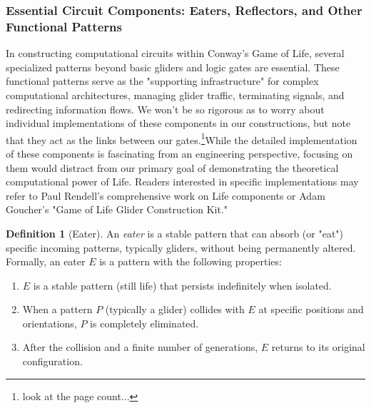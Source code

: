 \documentclass{article}
\theoremstyle{definition}
\newtheorem{definition}{Definition}[section]
\theoremstyle{plain}
\theoremstyle{plain}
\begin{document}



\subsubsection{Essential Circuit Components: Eaters, Reflectors, and Other Functional Patterns}
In constructing computational circuits within Conway's Game of Life, several specialized patterns beyond basic gliders and logic gates are essential. These functional patterns serve as the "supporting infrastructure" for complex computational architectures, managing glider traffic, terminating signals, and redirecting information flows.
We won't be so rigorous as to worry about individual implementations of these components in our constructions, but note that they act as the links between our gates.\footnote{look at the page count...}While the detailed implementation of these components is fascinating from an engineering perspective, focusing on them would distract from our primary goal of demonstrating the theoretical computational power of Life. Readers interested in specific implementations may refer to Paul Rendell's comprehensive work on Life components or Adam Goucher's "Game of Life Glider Construction Kit."

\begin{definition}[Eater]
An \textit{eater} is a stable pattern that can absorb (or "eat") specific incoming patterns, typically gliders, without being permanently altered. Formally, an eater $E$ is a pattern with the following properties:
\begin{enumerate}
  \item $E$ is a stable pattern (still life) that persists indefinitely when isolated.
  \item When a pattern $P$ (typically a glider) collides with $E$ at specific positions and orientations, $P$ is completely eliminated.
  \item After the collision and a finite number of generations, $E$ returns to its original configuration.
\end{enumerate}
\end{definition}
\end{document}
